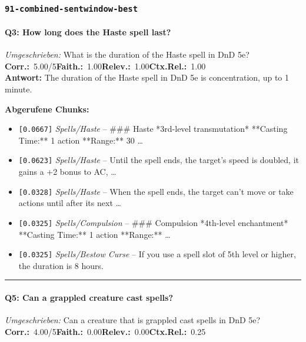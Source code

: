 \subsubsection*{\texttt{91-combined-sentwindow-best}}
\label{app:samples:91_combined_sentwindow_best}

\paragraph{Q3: How long does the Haste spell last?}
\textit{Umgeschrieben:} What is the duration of the Haste spell in DnD 5e?\\[2pt]
\noindent \textbf{Corr.:}~5.00/5\quad \textbf{Faith.:}~1.00\quad \textbf{Relev.:}~1.00\quad \textbf{Ctx.Rel.:}~1.00\\

\noindent\textbf{Antwort:} The duration of the Haste spell in DnD 5e is concentration, up to 1 minute.

\noindent\textbf{Abgerufene Chunks:}
\begin{itemize}[noitemsep, topsep=2pt]
  \item[\textbf{\#1}] \texttt{[0.0667]} \textit{Spells/Haste} -- \#\#\# Haste  *3rd-level transmutation*  **Casting Time:** 1 action  **Range:** 30 \ldots
  \item[\textbf{\#2}] \texttt{[0.0623]} \textit{Spells/Haste} -- Until the spell ends, the target's speed is doubled, it gains a +2 bonus to AC, \ldots
  \item[\textbf{\#3}] \texttt{[0.0328]} \textit{Spells/Haste} -- When the spell ends, the target can't move or take actions until after its next \ldots
  \item[\textbf{\#4}] \texttt{[0.0325]} \textit{Spells/Compulsion} -- \#\#\# Compulsion  *4th-level enchantment*  **Casting Time:** 1 action  **Range:** \ldots
  \item[\textbf{\#5}] \texttt{[0.0325]} \textit{Spells/Bestow Curse} -- If you use a spell slot of 5th level or higher, the duration is 8 hours.
\end{itemize}
\vspace{4pt}
\hrule
\vspace{6pt}

\paragraph{Q5: Can a grappled creature cast spells?}
\textit{Umgeschrieben:} Can a creature that is grappled cast spells in DnD 5e?\\[2pt]
\noindent \textbf{Corr.:}~4.00/5\quad \textbf{Faith.:}~0.00\quad \textbf{Relev.:}~0.00\quad \textbf{Ctx.Rel.:}~0.25\\

